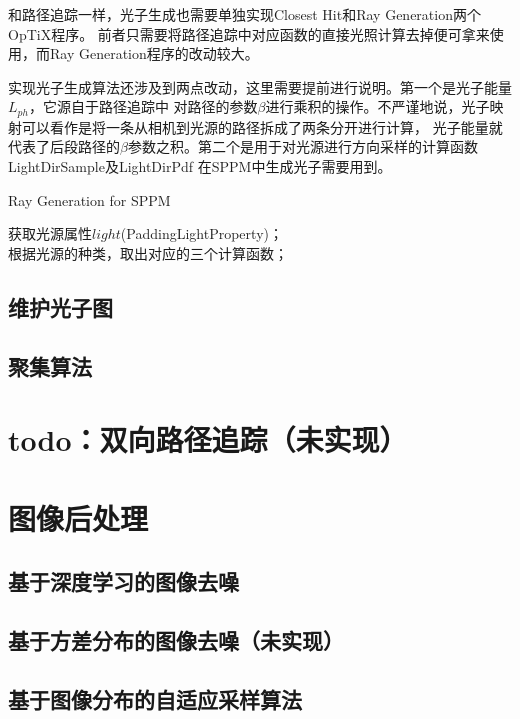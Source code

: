 和路径追踪一样，光子生成也需要单独实现Closest Hit和Ray Generation两个OpTiX程序。
前者只需要将路径追踪中对应函数的直接光照计算去掉便可拿来使用，而Ray Generation程序的改动较大。

实现光子生成算法还涉及到两点改动，这里需要提前进行说明。第一个是光子能量$L_{ph}$，它源自于路径追踪中
对路径的参数$\beta$进行乘积的操作。不严谨地说，光子映射可以看作是将一条从相机到光源的路径拆成了两条分开进行计算，
光子能量就代表了后段路径的$\beta$参数之积。第二个是用于对光源进行方向采样的计算函数LightDirSample及LightDirPdf
在SPPM中生成光子需要用到。

\begin{algorithm}
    \caption{Ray Generation for SPPM}

    获取光源属性$light$(PaddingLightProperty)；\\
    根据光源的种类，取出对应的三个计算函数；\\

\end{algorithm}

\subsection{维护光子图}
\subsection{聚集算法}

\section{todo：双向路径追踪（未实现）}


\section{图像后处理}
\subsection{基于深度学习的图像去噪}
\subsection{基于方差分布的图像去噪（未实现）}
\subsection{基于图像分布的自适应采样算法}
